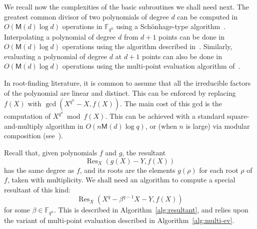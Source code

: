 \documentclass{sig-alternate}
\newcommand{\ff}[1]{\mathbb{F}_{#1}}
\newcommand{\dd}{d}
\newcommand{\qq}{q}
\newcommand{\nn}{n}
\newcommand{\qn}{{\qq^\nn}}
\newcommand{\extf}{\ff{\qn}}
\newcommand{\bigO}{O}
\newcommand{\Mul}{\mathsf{M}}
\DeclareMathOperator{\Res}{Res}
\newcounter{algo}
\newcommand{\todo}[1]{\textcolor{red}{TODO: #1}}
\renewcommand{\paragraph}[1]{\smallskip\noindent{{\bf \rm #1.}}}
\begin{document}
\paragraph{Fundamental algorithms}
%
%
We recall now the complexities of the basic subroutines we shall need next.
%
The greatest common divisor of two polynomials of degree $\dd$ can be computed in $\bigO(\Mul(\dd)\log \dd)$ operations in $\extf$ using a Sch\"on\-hage-type algorithm~\cite{Schoenhage1971,Thull1990}.
%
Interpolating a polynomial of degree $\dd$ from $\dd+1$ points can be done in $O(\Mul(\dd)\log\dd)$ operations using the algorithm described in~\cite[Ch. 10]{Gathen2003}. Similarly, evaluating a polynomial of degree $\dd$ at $\dd+1$ points can also be done in $\bigO(\Mul(\dd)\log \dd)$ operations using the multi-point evaluation algorithm of~\cite[Ch. 10]{Gathen2003}.

In root-finding literature, it is common to assume that all the irreducible factors of the polynomial are linear and distinct. This can be enforced by replacing $f(X)$ with $\gcd(X^\qn-X,f(X))$. The main cost of this gcd is the computation of $X^\qn\bmod f(X)$. This can be achieved with a standard square-and-multiply algorithm in $O(\nn\Mul(\dd)\log q)$, or (when $\nn$ is large) via modular composition (see~\cite{GathenS92,Kedlaya11}). 




Recall that, given polynomials $f$ and $g$, the resultant
$$\Res_X(g(X)-Y,f(X))$$
has the same degree as $f$, and its roots are the elements $g(\rho)$
for each root $\rho$ of $f$, taken with multiplicity. We shall need an
algorithm to compute a special resultant of this kind:
$$\Res_X(X^\qq-\beta^{\qq-1}X-Y,f(X))$$
for some $\beta\in\extf$. This is described in
Algorithm~\ref{alg:resultant}, and relies upon the variant of
multi-point evaluation described in Algorithm~\ref{alg:multi-ev}.
\end{document}

